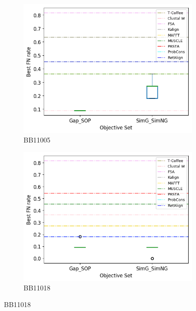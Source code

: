 \begin{figure}[!htbp]
\begin{adjustwidth}{-1cm}{-1cm}
	\begin{subfigure}{0.22\textwidth}
		\includegraphics[width=\columnwidth]{Figure/summary/precomputedInit/Balibase/BB11005_objset_fnrate_rank}
		\caption{BB11005}
	\end{subfigure}	
	\begin{subfigure}{0.22\textwidth}
		\includegraphics[width=\columnwidth]{Figure/summary/precomputedInit/Balibase/BB11018_objset_fnrate_rank}
		\caption{BB11018}

\end{subfigure}
\end{adjustwidth}
\end{figure}
